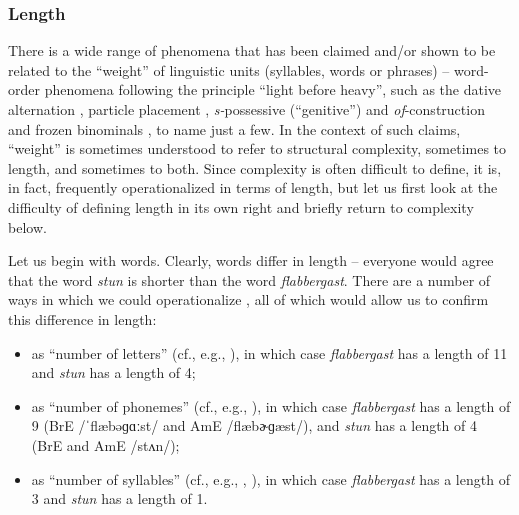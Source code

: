 \subsubsection{Length}
\label{sec:operationalizinglength}

There is a wide range of phenomena that has been claimed and/or shown to be related to the ``weight'' of linguistic units (syllables, words or phrases) -- word-order phenomena following the principle ``light before heavy'', such as the dative alternation \citep{thompson_iconicity_1987}, particle placement \citep{chen_discourse_1986}, \textit{s-}possessive (``genitive'') and \textit{of}-construction \citep{deane_english_1987} and frozen binominals \citep{sobkowiak_unmarked-before-marked_1993}, to name just a few. In the context of such claims, ``weight'' is sometimes understood to refer to structural complexity, sometimes to length, and sometimes to both. Since complexity is often difficult to define, it is, in fact, frequently operationalized in terms of length, but let us first look at the difficulty of defining length in its own right and briefly return to complexity below.

Let us begin with words. Clearly, words differ in length -- everyone would agree that the word \textit{stun} is shorter than the word \textit{flabbergast}. There are a number of ways in which we could operationalize , all of which would allow us to confirm this difference in length:

\begin{itemize}
\item as ``number of letters'' (cf., e.g., \citealt{wulff_multifactorial_2003}), in which case \textit{flabbergast} has a length of 11 and \textit{stun} has a length of 4; 
\item as ``number of phonemes'' (cf., e.g., \citealt{sobkowiak_unmarked-before-marked_1993}), in which case \textit{flabbergast} has a length of 9 (BrE /ˈflæbəɡɑːst/ and AmE /flæbɚɡæst/), and \textit{stun} has a length of 4 (BrE and AmE /stʌn/);
\item as ``number of syllables'' (cf., e.g., \citealt{sobkowiak_unmarked-before-marked_1993}, \citealt{rohdenburg_constructional_2003}), in which case \textit{flabbergast} has a length of 3 and \textit{stun} has a length of 1.
\end{itemize}

